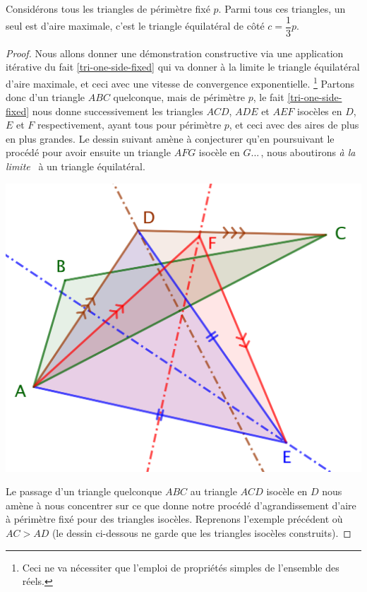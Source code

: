 \begin{fact} \label{iso-tri}
	Considérons tous les triangles de périmètre fixé $p$. Parmi tous ces triangles, un seul est d'aire maximale, c'est le triangle équilatéral de côté $c = \dfrac13 p$.
\end{fact}


\begin{proof}	
	Nous allons donner une démonstration constructive via une application itérative du fait \ref{tri-one-side-fixed} qui va donner à la limite le triangle équilatéral d'aire maximale, et ceci avec une vitesse de convergence exponentielle.%
	\footnote{
		Ceci ne va nécessiter que l'emploi de propriétés simples de l'ensemble des réels.
	}
	Partons donc d'un triangle $ABC$ quelconque, mais de périmètre $p$, le fait \ref{tri-one-side-fixed} nous donne successivement les triangles $ACD$, $ADE$ et $AEF$ isocèles en $D$, $E$ et $F$ respectivement, ayant tous pour périmètre $p$, et ceci avec des aires de plus en plus grandes.  
	Le dessin suivant amène à conjecturer qu'en poursuivant le procédé pour avoir ensuite un triangle $AFG$ isocèle en $G$...\,, nous aboutirons \og \emph{à la limite} \fg\ à un triangle équilatéral.

	\begin{center}
		\includegraphics[scale=.4]{content/triangle-gene/proof.png}
	\end{center} 

	
	Le passage d'un triangle quelconque $ABC$ au triangle $ACD$ isocèle en $D$ nous amène à nous concentrer sur ce que donne notre procédé d'agrandissement d'aire à périmètre fixé pour des triangles isocèles. Reprenons l'exemple précédent où $AC > AD$ (le dessin ci-dessous ne garde que les triangles isocèles construits).


\end{proof}
